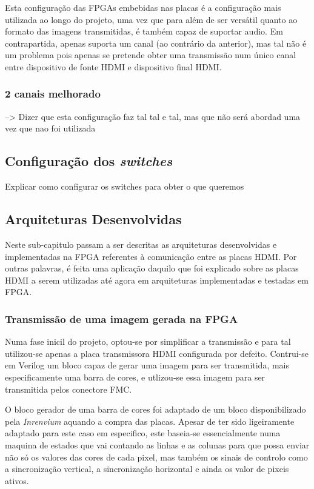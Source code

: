 Esta configuração das FPGAs embebidas nas placas é a configuração mais utilizada ao longo do projeto, uma vez que para além de ser versátil quanto ao formato das imagens transmitidas, é também capaz de suportar audio. Em contrapartida, apenas suporta um canal (ao contrário da anterior), mas tal não é um problema pois apenas se pretende obter uma transmissão num único canal entre dispositivo de fonte HDMI e dispositivo final HDMI. 


\subsubsection{2 canais melhorado} \label{subsubsec:HDMIconfigMelhorado}

--> Dizer que esta configuração faz tal tal e tal, mas que não será abordad uma vez que nao foi utilizada

\subsection{Configuração dos \textit{switches}}

Explicar como configurar os switches para obter o que queremos

\subsection{Arquiteturas Desenvolvidas} \label{subsec:HDMIarquiteturas}

Neste sub-capitulo passam a ser descritas as arquiteturas desenvolvidas e implementadas na FPGA referentes à comunicação entre as placas HDMI.  Por outras palavras, é feita uma aplicação daquilo que foi explicado sobre as placas HDMI a serem utilizadas até agora em arquiteturas implementadas e testadas em FPGA.

\subsubsection{Transmissão de uma imagem gerada na FPGA} \label{subsub:planA}

Numa fase inicil do projeto, optou-se por simplificar a transmissão e para tal utilizou-se apenas a placa transmissora HDMI configurada por defeito. Contrui-se em Verilog um bloco capaz de gerar uma imagem para ser transmitida, mais especificamente uma barra de cores, e utlizou-se essa imagem para ser transmitida pelos conectore FMC.

O bloco gerador de uma barra de cores foi adaptado de um bloco disponibilizado pela \textit{Inrenvium} aquando a compra das placas. Apesar de ter sido ligeiramente adaptado para este caso em especifico, este baseia-se essencialmente numa maquina de estados que vai contando as linhas e as colunas para que possa enviar não só os valores das cores de cada pixel, mas também os sinais de controlo como a sincronização vertical, a sincronização horizontal e ainda os valor de pixeis ativos.

